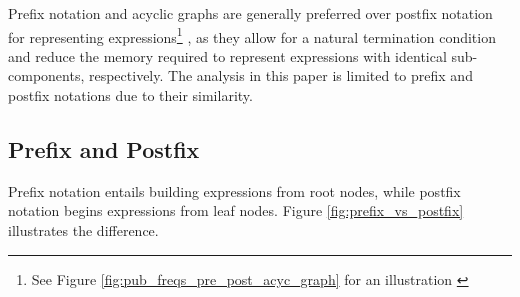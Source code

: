 \documentclass[runningheads]{llncs}
\begin{document}
Prefix notation and acyclic graphs are generally preferred over postfix notation for representing expressions\footnote{See Figure \ref{fig:pub_freqs_pre_post_acyc_graph} for an illustration \cite{cholewiak2021scholarly}} \cite{defranca2023interpretable}, as they allow for a natural termination condition and reduce the memory required to represent expressions with identical sub-components, respectively. The analysis in this paper is limited to prefix and postfix notations due to their similarity.

 


\subsection{Prefix and Postfix}
Prefix notation entails building expressions from root nodes, while postfix notation begins expressions from leaf nodes. Figure \ref{fig:prefix_vs_postfix} illustrates the difference.
\end{document}
